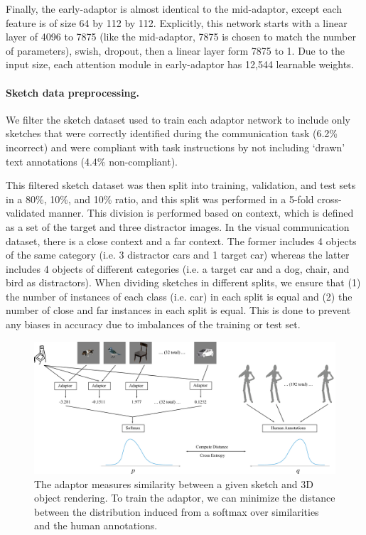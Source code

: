 \documentclass[9pt,twocolumn,twoside]{pnas-new}
\begin{document}
{Finally, the early-adaptor is almost identical to the mid-adaptor, except each feature is of size 64 by 112 by 112. Explicitly, this network starts with a linear layer of 4096 to 7875 (like the mid-adaptor, 7875 is chosen to match the number of parameters), swish, dropout, then a linear layer form 7875 to 1. Due to the input size, each attention module in early-adaptor has 12,544 learnable weights.

\paragraph{Sketch data preprocessing.} We filter the sketch dataset used to train each adaptor network to include only sketches that were correctly identified during the communication task (6.2\% incorrect) and were compliant with task instructions by not including `drawn' text annotations (4.4\% non-compliant).

This filtered sketch dataset was then split into training, validation, and test sets in a 80\%, 10\%, and 10\% ratio, and this split was performed in a 5-fold cross-validated manner. This division is performed based on context, which is defined as a set of the target and three distractor images. In the visual communication dataset, there is a close context and a far context. The former includes 4 objects of the same category (i.e. 3 distractor cars and 1 target car) whereas the latter includes 4 objects of different categories (i.e. a target car and a dog, chair, and bird as distractors). When dividing sketches in different splits, we ensure that (1) the number of instances of each class (i.e. car) in each split is equal and (2) the number of close and far instances in each split is equal. This is done to prevent any biases in accuracy due to imbalances of the training or test set.

\begin{figure}[h!]
\centering
\includegraphics[width=0.95\columnwidth]{figures/adaptor_algorithm.pdf}
\caption{The adaptor measures similarity between a given sketch and 3D object rendering. To train the adaptor, we can minimize the distance between the distribution induced from a softmax over similarities and the human annotations.}
\label{fig:adaptor_training}
\end{figure}

}
\end{document}
